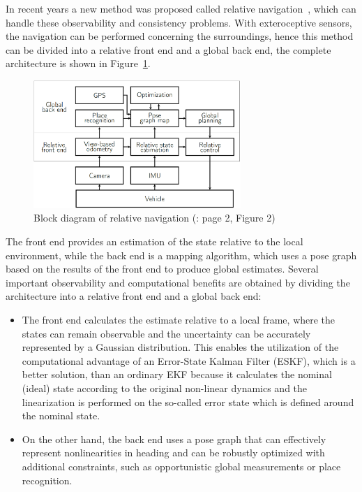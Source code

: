 In recent years a new method was proposed called relative navigation~\cite{rel-nav-1, rel-nav-2}, which can handle these observability and consistency problems. With exteroceptive sensors, the navigation can be performed concerning the surroundings, hence this method can be divided into a relative front end and a global back end, the complete architecture is shown in Figure~\ref{fig:real-nav}. 
\begin{figure}[!ht]
    \centering
    \includegraphics[width=0.7\textwidth]{figures/rel-nav}
    \caption{Block diagram of relative navigation (\cite{rel-nav}: page 2, Figure 2)}\label{fig:real-nav}
\end{figure}
The front end provides an estimation of the state relative to the local environment, while the back end is a mapping algorithm, which uses a pose graph based on the results of the front end to produce global estimates. Several important observability and computational benefits are obtained by dividing the architecture into a relative front end and a global back end:
\begin{itemize}
    \item 
    The front end calculates the estimate relative to a local frame, where the states can remain observable and the uncertainty can be accurately represented by a Gaussian distribution. This enables the utilization of the computational advantage of an Error-State Kalman Filter (ESKF), which is a better solution, than an ordinary EKF because it calculates the nominal (ideal) state according to the original non-linear dynamics and the linearization is performed on the so-called error state which is defined around the nominal state.
    
    \item 
     On the other hand, the back end uses a pose graph that can effectively represent nonlinearities in heading and can be robustly optimized with additional constraints, such as opportunistic global measurements or place recognition.
\end{itemize}

